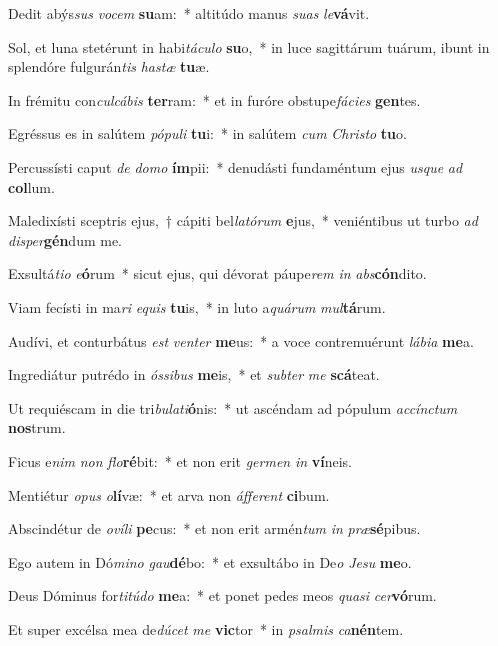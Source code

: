 \item Dedit abýs\textit{sus} \textit{vo}\textit{cem} \textbf{su}am:~* altitúdo manus \textit{su}\textit{as} \textit{le}\textbf{vá}vit.
\item Sol, et luna stetérunt in habi\textit{tá}\textit{cu}\textit{lo} \textbf{su}o,~* in luce sagittárum tuárum, ibunt in splendóre fulgurán\textit{tis} \textit{has}\textit{tæ} \textbf{tu}æ.
\item In frémitu con\textit{cul}\textit{cá}\textit{bis} \textbf{ter}ram:~* et in furóre obstupe\textit{fá}\textit{ci}\textit{es} \textbf{gen}tes.
\item Egréssus es in salútem \textit{pó}\textit{pu}\textit{li} \textbf{tu}i:~* in salútem \textit{cum} \textit{Chris}\textit{to} \textbf{tu}o.
\item Percussísti caput \textit{de} \textit{do}\textit{mo} \textbf{ím}pii:~* denudásti fundaméntum ejus \textit{us}\textit{que} \textit{ad} \textbf{col}lum.
\item Maledixísti sceptris ejus,~† cápiti bel\textit{la}\textit{tó}\textit{rum} \textbf{e}jus,~* veniéntibus ut turbo \textit{ad} \textit{di}\textit{sper}\textbf{gén}dum me.
\item Exsultá\textit{ti}\textit{o} \textit{e}\textbf{ó}rum~* sicut ejus, qui dévorat páupe\textit{rem} \textit{in} \textit{abs}\textbf{cón}dito.
\item Viam fecísti in ma\textit{ri} \textit{e}\textit{quis} \textbf{tu}is,~* in luto a\textit{quá}\textit{rum} \textit{mul}\textbf{tá}rum.
\item Audívi, et conturbátus \textit{est} \textit{ven}\textit{ter} \textbf{me}us:~* a voce contremuérunt \textit{lá}\textit{bi}\textit{a} \textbf{me}a.
\item Ingrediátur putrédo in \textit{ós}\textit{si}\textit{bus} \textbf{me}is,~* et \textit{sub}\textit{ter} \textit{me} \textbf{scá}teat.
\item Ut requiéscam in die tri\textit{bu}\textit{la}\textit{ti}\textbf{ó}nis:~* ut ascéndam ad pópulum \textit{ac}\textit{cínc}\textit{tum} \textbf{nos}trum.
\item Ficus e\textit{nim} \textit{non} \textit{flo}\textbf{ré}bit:~* et non erit \textit{ger}\textit{men} \textit{in} \textbf{ví}neis.
\item Mentiétur \textit{o}\textit{pus} \textit{o}\textbf{lí}væ:~* et arva non \textit{áf}\textit{fe}\textit{rent} \textbf{ci}bum.
\item Abscindétur de \textit{o}\textit{ví}\textit{li} \textbf{pe}cus:~* et non erit armén\textit{tum} \textit{in} \textit{præ}\textbf{sé}pibus.
\item Ego autem in Dó\textit{mi}\textit{no} \textit{gau}\textbf{dé}bo:~* et exsultábo in De\textit{o} \textit{Je}\textit{su} \textbf{me}o.
\item Deus Dóminus for\textit{ti}\textit{tú}\textit{do} \textbf{me}a:~* et ponet pedes meos \textit{qua}\textit{si} \textit{cer}\textbf{vó}rum.
\item Et super excélsa mea de\textit{dú}\textit{cet} \textit{me} \textbf{vic}tor~* in \textit{psal}\textit{mis} \textit{ca}\textbf{nén}tem.
